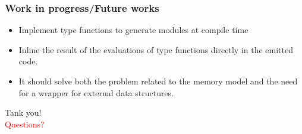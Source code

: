 \documentclass[10pt,a4paper]{beamer}
\begin{document}
\begin{frame}
	\frametitle{Work in progress/Future works}
	\begin{itemize}
		\item Implement type functions to generate modules at compile time
		\item Inline the result of the evaluations of type functions directly in the emitted code.
		\item It should solve both the problem related to the memory model and the need for a wrapper for external data structures.
	\end{itemize}
\end{frame}

\begin{frame}
	\centering
	\Huge
	Tank you!\\
	\vspace{0.5cm}
	\textcolor{red}{Questions?}
\end{frame}
\end{document}
